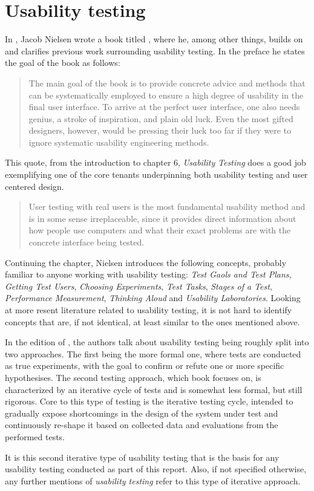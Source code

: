 \section{Usability testing}

  In \citeyear{citeHeuristicsNielsenUsabilityEngineering}, Jacob Nielsen wrote a
  book titled %
  \cite{citeHeuristicsNielsenUsabilityEngineering}, where he, among other
  things, builds on and clarifies previous work surrounding usability testing.
  In the preface he states the goal of the book as follows:

  \begin{quote}
    The main goal of the book is to provide concrete advice and
    methods that can be systematically employed to ensure a high
    degree of usability in the final user interface. To arrive at the perfect
    user interface, one also needs genius, a stroke of inspiration, and
    plain old luck. Even the most gifted designers, however, would be
    pressing their luck too far if they were to ignore systematic usability
    engineering methods.
  \end{quote}

  This quote, from the introduction to chapter 6,
  \textit{Usability Testing}%
  \cite[p. 165]{citeHeuristicsNielsenUsabilityEngineering}
  does a good job exemplifying one of the core tenants underpinning both
  usability testing and user centered design.

  \begin{quote}
    User testing with real users is the most fundamental usability method and
    is in some sense irreplaceable, since it provides direct information about
    how people use computers and what their exact problems are with the
    concrete interface being tested.
  \end{quote}

  Continuing the chapter, Nielsen introduces the following concepts, probably
  familiar to anyone working with usability testing:
  \textit{Test Gaols and Test Plans},
  \textit{Getting Test Users},
  \textit{Choosing Experiments},
  \textit{Test Tasks},
  \textit{Stages of a Test},
  \textit{Performance Measurement},
  \textit{Thinking Aloud} and
  \textit{Usability Laboratories}.
  Looking at more resent literature related to usability testing, it is not
  hard to identify concepts that are, if not identical, at least similar to the
  ones mentioned above.

  In the \citeyear{citeHandbookUsability} edition of
  \cite[p. 19]{citeHandbookUsability}, the
  authors talk about usability testing being roughly split into two approaches.
  The first being the more formal one, where tests are conducted as true
  experiments, with the goal to confirm or refute one or more specific
  hypothesises. The second testing approach, which book focuses on, is
  characterized by an iterative cycle of tests and is somewhat less formal, but
  still rigorous. Core to this type of testing is the iterative testing cycle,
  intended to gradually expose shortcomings in the design of the system under
  test and continuously re-shape it based on collected data and evaluations
  from the performed tests.

  It is this second iterative type of usability testing that is the basis for
  any usability testing conducted as part of this report. Also, if not
  specified otherwise, any further mentions of \textit{usability testing}
  refer to this type of iterative approach.
